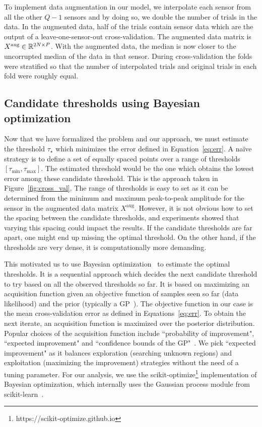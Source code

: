 To implement data augmentation in our model, we interpolate each sensor from all the other $Q-1$ sensors and by doing so, we double the number of trials in the data. In the augmented data, half of the trials contain sensor data which are the output of a leave-one-sensor-out cross-validation. The augmented data matrix is $X^{\textrm{aug}} \in \mathbb{R}^{2N \times P}$. With the augmented data, the median is now closer to the uncorrupted median of the data in that sensor. During cross-validation the folds were stratified so that the number of interpolated trials and original trials in each fold were roughly equal.

\subsection{Candidate thresholds using Bayesian optimization}
\label{sec:bayesian_opt}
Now that we have formalized the problem and our approach, we must estimate the threshold $\tau_{\star}$ which minimizes the error defined in Equation~\eqref{eq:err}. A na\"ive strategy is to define a set of equally spaced points over a range of thresholds $[\tau_{\min}, \tau_{\max}]$. The estimated threshold would be the one which obtains the lowest error among these candidate threshold. This is the approach taken in Figure~\ref{fig:cross_val}. The range of thresholds is easy to set as it can be determined from the minimum and maximum peak-to-peak amplitude for the sensor in the augmented data matrix $X^{\textrm{aug}}$. However, it is not obvious how to set the spacing between the candidate thresholds, and experiments showed that varying this spacing could impact the results. If the candidate thresholds are far apart, one might end up missing the optimal threshold. On the other hand, if the thresholds are very dense, it is computationally more demanding.

This motivated us to use Bayesian optimization~\citep{snoek2012practical, bergstra2011algorithms} to estimate the optimal thresholds. It is a sequential approach which decides the next candidate threshold to try based on all the observed thresholds so far. It is based on maximizing an acquisition function given an objective function of samples seen so far (data likelihood) and the prior (typically a \ac{GP}~\citep{rasmussen2006gaussian}). The objective function in our case is the mean cross-validation error as defined in Equations~\eqref{eq:err}. To obtain the next iterate, an acquisition function is maximized over the posterior distribution. Popular choices of the acquisition function include ``probability of improvement", ``expected improvement" and ``confidence bounds of the \ac{GP}"~\citep{snoek2012practical}. We pick ``expected improvement" as it balances exploration (searching unknown regions) and exploitation (maximizing the improvement) strategies without the need of a tuning parameter. For our analysis, we use the scikit-optimize\footnote{https://scikit-optimize.github.io} implementation of Bayesian optimization, which internally uses the Gaussian process module from scikit-learn~\citep{scikit-learn}.

